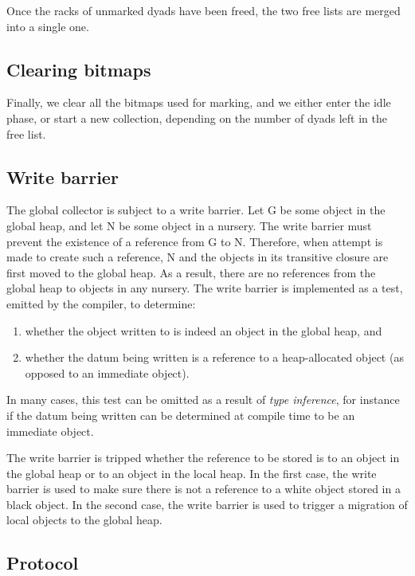 Once the racks of unmarked dyads have been freed, the two free lists
are merged into a single one.

\subsection{Clearing bitmaps}

Finally, we clear all the bitmaps used for marking, and we either
enter the idle phase, or start a new collection, depending on the
number of dyads left in the free list.

\subsection{Write barrier}

The global collector is subject to a write barrier.  Let G be some
object in the global heap, and let N be some object in a nursery.  The
write barrier must prevent the existence of a reference from G to N.
Therefore, when attempt is made to create such a reference, N and the
objects in its transitive closure are first moved to the global heap.
As a result, there are no references from the global heap to objects
in any nursery.  The write barrier is implemented as a test, emitted
by the compiler, to determine:

\begin{enumerate}
\item whether the object written to is indeed an object in the global
  heap, and
\item whether the datum being written is a reference to a
  heap-allocated object (as opposed to an immediate object).
\end{enumerate}

In many cases, this test can be omitted as a result of \emph{type
  inference}, for instance if the datum being written can be
determined at compile time to be an immediate object.

The write barrier is tripped whether the reference to be stored is to
an object in the global heap or to an object in the local heap.  In
the first case, the write barrier is used to make sure there is not a
reference to a white object stored in a black object.  In the second
case, the write barrier is used to trigger a migration of local
objects to the global heap.

\subsection{Protocol}

